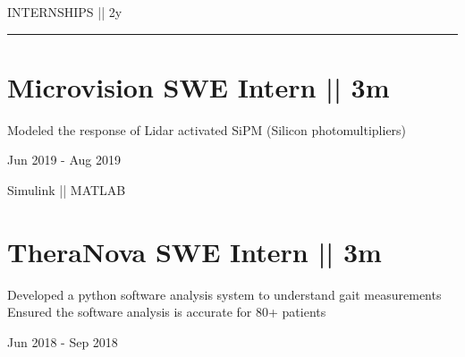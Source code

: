 {
\hspace{-1.72in}\noindent\color{cblue}
{INTERNSHIPS  } 
{\small \color{black} || 2y}
}

\vspace{-1.6ex}
{\hspace{-1.73in}\noindent\color{dblue}\rule{6.935in}{0.4pt}} %
\vspace{-5ex}


\section
{\textbf{Microvision}
\newline
SWE Intern || 3m
\newline}


\vspace{-2.5ex}
\begin{detail}
\BulletItem
Modeled the response of Lidar activated SiPM (Silicon photomultipliers) 
\end{detail}

\begin{subtitle}
\vspace{-5ex}
{{Jun 2019 - Aug 2019}} 
\end{subtitle}

\vspace{-1.5ex}
{
\vspace{-0.8ex}
\color{cyan}\small
{Simulink || MATLAB} %
}

\section
{\textbf{TheraNova}
\newline
SWE Intern || 3m
}

\BulletItem
\vspace{-2.5ex}
\begin{detail}

\BulletItem
 Developed a python software analysis system to understand gait measurements
\BulletItem
 Ensured the software analysis is accurate for 80+ patients
\end{detail}

\begin{subtitle}
\vspace{-7.8ex}
{{Jun 2018 - Sep 2018}}
\end{subtitle}
\vspace{0ex}

